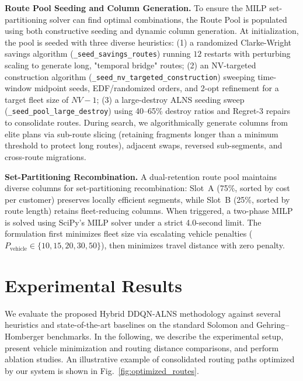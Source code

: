 \documentclass[journal]{IEEEtran}
\begin{document}
\textbf{Route Pool Seeding and Column Generation.}
To ensure the MILP set-partitioning solver can find optimal combinations, the Route Pool is populated using both constructive seeding and dynamic column generation. At initialization, the pool is seeded with three diverse heuristics:
(1) a randomized Clarke-Wright savings algorithm (\texttt{\_seed\_savings\_routes}) running $12$ restarts with perturbing scaling to generate long, "temporal bridge" routes;
(2) an NV-targeted construction algorithm (\texttt{\_seed\_nv\_targeted\_construction}) sweeping time-window midpoint seeds, EDF/randomized orders, and 2-opt refinement for a target fleet size of $NV-1$;
(3) a large-destroy ALNS seeding sweep (\texttt{\_seed\_pool\_large\_destroy}) using 40--65\% destroy ratios and Regret-3 repairs to consolidate routes.
During search, we algorithmically generate columns from elite plans via sub-route slicing (retaining fragments longer than a minimum threshold to protect long routes), adjacent swaps, reversed sub-segments, and cross-route migrations.

\textbf{Set-Partitioning Recombination.}
A dual-retention route pool maintains diverse columns for set-partitioning
recombination: Slot~A (75\%, sorted by cost per customer) preserves locally
efficient segments, while Slot~B (25\%, sorted by route length) retains
fleet-reducing columns. When triggered, a two-phase MILP is solved using SciPy's MILP solver under a strict 4.0-second limit. The formulation first minimizes fleet size via escalating vehicle penalties ($P_{\text{vehicle}} \in \{10, 15, 20, 30, 50\}$), then minimizes travel distance with zero penalty.



\section{Experimental Results}
\label{sec:results}

We evaluate the proposed Hybrid DDQN-ALNS methodology against several heuristics and state-of-the-art baselines on the standard Solomon and Gehring--Homberger benchmarks. In the following, we describe the experimental setup, present vehicle minimization and routing distance comparisons, and perform ablation studies. An illustrative example of consolidated routing paths optimized by our system is shown in Fig.~\ref{fig:optimized_routes}.
\end{document}
